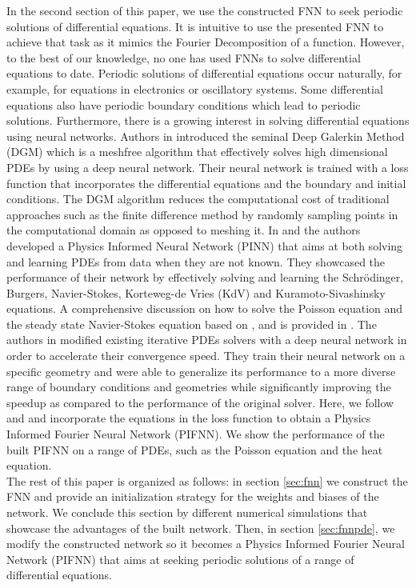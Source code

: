 \documentclass[AMS,STIX1COL]{WileyNJD-v2}
\begin{document}
In the second section of this paper, we use the constructed FNN to seek periodic solutions of differential equations. It is intuitive to use the presented FNN to achieve that task as it mimics the Fourier Decomposition of a function. However, to the best of our knowledge, no one has used FNNs to solve differential equations to date. Periodic solutions of differential equations occur naturally, for example, for equations in electronics or oscillatory systems. Some differential equations also have periodic boundary conditions which lead to periodic solutions. Furthermore, there is a growing interest in solving differential equations using neural networks. Authors in \cite{Sirignano2018} introduced the seminal Deep Galerkin Method (DGM) which is a meshfree algorithm that effectively solves high dimensional PDEs by using a deep neural network. Their neural network is trained with a loss function that incorporates the differential equations and the boundary and initial conditions. The DGM algorithm reduces the computational cost of traditional approaches such as the finite difference method by randomly sampling points in the computational domain as opposed to meshing it. In \cite{Raissi2018} and \cite{raissi2017hidden}  the authors developed a Physics Informed Neural Network (PINN) that aims at both solving and learning PDEs from data when they are not known. They showcased the performance of their network by effectively solving and learning the Schrödinger, Burgers, Navier-Stokes, Korteweg-de Vries (KdV) and Kuramoto-Sivashinsky equations. A comprehensive discussion on how to solve the Poisson equation and the steady state Navier-Stokes equation based on \cite{Raissi2018}, \cite{raissi2017hidden} and \cite{raissi2019Pinn} is provided in \cite{Dockhorn2019}. The authors in \cite{hsieh2019learning} modified existing iterative PDEs solvers with a deep neural network in order to accelerate their convergence speed. They train their neural network on a specific geometry and were able to generalize its performance to a more diverse range of boundary conditions and geometries while significantly improving the speedup as compared to the performance of the original solver. Here, we follow \cite{raissi2019Pinn} and \cite{Sirignano2018} and incorporate the equations in the loss function to obtain a Physics Informed Fourier Neural Network (PIFNN).  We show the performance of the built PIFNN on a range of PDEs, such as the Poisson equation and the heat equation. \\

The rest of this paper is organized as follows: in section \ref{sec:fnn} we construct the FNN and provide an initialization strategy for the weights and biases of the network. We conclude this section by different numerical simulations that showcase the advantages of the built network. Then, in section \ref{sec:fnnpde}, we modify the constructed network so it becomes a Physics Informed Fourier Neural Network (PIFNN) that aims at seeking periodic solutions of a range of differential equations. 
\end{document}
